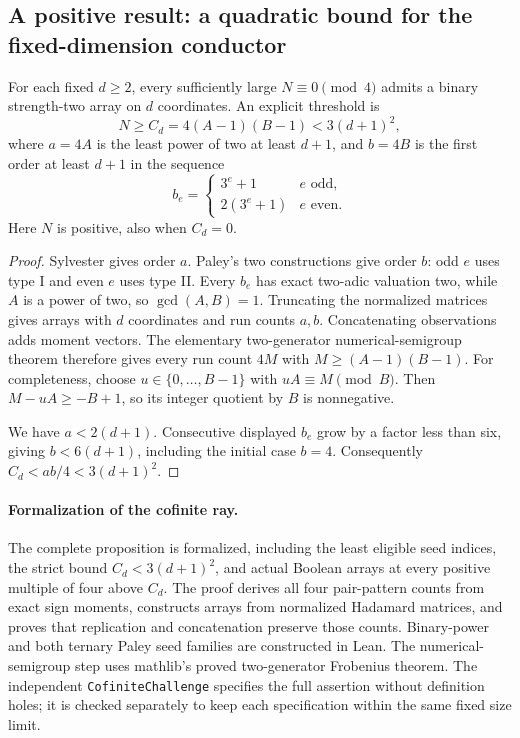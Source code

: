 \subsection{A positive result: a quadratic bound for the fixed-dimension conductor}
\begin{proposition}
For each fixed $d\ge2$, every sufficiently large $N\equiv0\pmod4$
admits a binary strength-two array on $d$ coordinates. An explicit
threshold is
\[
 N\ge C_d=4(A-1)(B-1)<3(d+1)^2,
\]
where $a=4A$ is the least power of two at least $d+1$, and $b=4B$ is
the first order at least $d+1$ in the sequence
\[
 b_e=\begin{cases}3^e+1&e\text{ odd},\\2(3^e+1)&e\text{ even}.
 \end{cases}
\]
Here $N$ is positive, also when $C_d=0$.
\end{proposition}
\begin{proof}
Sylvester gives order $a$. Paley's two constructions give order $b$:
odd $e$ uses type I and even $e$ uses type II. Every $b_e$ has exact
two-adic valuation two, while $A$ is a power of two, so $\gcd(A,B)=1$.
Truncating the normalized matrices gives arrays with $d$ coordinates
and run counts $a,b$. Concatenating observations adds moment vectors.
The elementary two-generator numerical-semigroup theorem therefore
gives every run count $4M$ with $M\ge(A-1)(B-1)$. For completeness,
choose $u\in\{0,\ldots,B-1\}$ with $uA\equiv M\pmod B$. Then
$M-uA\ge-B+1$, so its integer quotient by $B$ is nonnegative.

We have $a<2(d+1)$. Consecutive displayed $b_e$ grow by a factor less
than six, giving $b<6(d+1)$, including the initial case $b=4$.
Consequently $C_d<ab/4<3(d+1)^2$.
\end{proof}
\paragraph{Formalization of the cofinite ray.}
The complete proposition is formalized, including the least eligible seed
indices, the strict bound $C_d<3(d+1)^2$, and actual Boolean arrays at
every positive multiple of four above $C_d$. The proof derives all four
pair-pattern counts from exact sign moments, constructs arrays from
normalized Hadamard matrices, and proves that replication and concatenation
preserve those counts. Binary-power and both ternary Paley seed families
are constructed in Lean. The numerical-semigroup step uses mathlib's
proved two-generator Frobenius theorem. The independent
\texttt{CofiniteChallenge} specifies the full assertion without definition
holes; it is checked separately to keep each specification within the
same fixed size limit.

